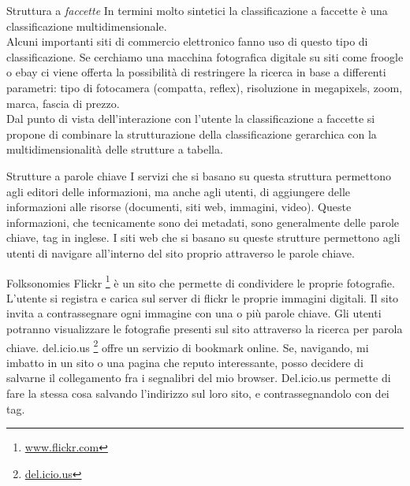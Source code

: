 \documentclass[pdf,mpa]{prosper}
\begin{document}
\begin{slide}{Struttura a \textit{faccette}}
\label{sec:ia_faccette}
In termini molto sintetici la classificazione a faccette è una classificazione multidimensionale.\\
Alcuni importanti siti di commercio elettronico fanno uso di questo tipo di classificazione. Se cerchiamo una macchina fotografica digitale su siti come froogle o ebay ci viene offerta la possibilità di restringere la ricerca in base a differenti parametri: tipo di fotocamera (compatta, reflex), risoluzione in megapixels, zoom, marca, fascia di prezzo.\\
Dal punto di vista dell'interazione con l'utente la classificazione a faccette si propone di combinare la strutturazione della classificazione gerarchica con la multidimensionalità delle strutture a tabella.

\end{slide}

\begin{slide}{Strutture a parole chiave}
I servizi che si basano su questa struttura permettono agli editori delle informazioni, ma anche agli utenti, di aggiungere delle informazioni alle risorse (documenti, siti web, immagini, video). Queste informazioni, che tecnicamente sono dei metadati, sono generalmente delle parole chiave, tag in inglese. I siti web che si basano su queste strutture permettono agli utenti di navigare all'interno del sito proprio attraverso le parole chiave.\\
\end{slide}

\begin{slide}{Folksonomies}
Flickr \footnote{\href{http://www.flickr.com/photos/sweetdreamer_it/}{www.flickr.com}} è un sito che permette di condividere le proprie fotografie. L'utente si registra e carica sul server di flickr le proprie immagini digitali. Il sito invita a contrassegnare ogni immagine con una o più parole chiave. Gli utenti potranno visualizzare le fotografie presenti sul sito attraverso la ricerca per parola chiave.
del.icio.us \footnote{\href{http://del.icio.us/sweetdreamerit}{del.icio.us}} offre un servizio di bookmark online. Se, navigando, mi imbatto in un sito o una pagina che reputo interessante, posso decidere di salvarne il collegamento fra i segnalibri del mio browser. Del.icio.us permette di fare la stessa cosa salvando l'indirizzo sul loro sito, e contrassegnandolo con dei tag.
\end{slide}
\end{document}
